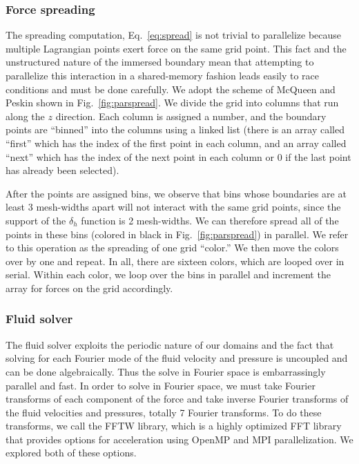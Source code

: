 \documentclass[]{article}
\begin{document}
\subsubsection{Force spreading}
The spreading computation, Eq.\ \eqref{eq:spread} is not trivial to parallelize because multiple Lagrangian points exert force on the same grid point. This fact and the unstructured nature of the immersed boundary mean that attempting to parallelize this interaction in a shared-memory fashion leads easily to race conditions and must be done carefully. We adopt the scheme of McQueen and Peskin \cite{mcqueen} shown in Fig.\ \ref{fig:parspread}. We divide the grid into columns that run along the $z$ direction. Each column is assigned a number, and the boundary points are ``binned'' into the columns using a linked list (there is an array called ``first'' which has the index of the first point in each column, and an array called ``next'' which has the index of the next point in each column or 0 if the last point has already been selected). 

After the points are assigned bins, we observe that bins whose boundaries are at least 3 mesh-widths apart will not interact with the same grid points, since the support of the $\delta_h$ function is 2 mesh-widths. We can therefore spread all of the points in these bins (colored in black in Fig.\ \ref{fig:parspread}) in parallel. We refer to this operation as the spreading of one grid ``color.'' We then move the colors over by one and repeat. In all, there are sixteen colors, which are looped over in serial. Within each color, we loop over the bins in parallel and increment the array for forces on the grid accordingly. 

\subsubsection{Fluid solver}
The fluid solver exploits the periodic nature of our domains and the fact that solving for each Fourier mode of the fluid velocity and pressure is uncoupled and can be done algebraically. Thus the solve in Fourier space is embarrassingly parallel and fast. In order to solve in Fourier space, we must take Fourier transforms of each component of the force and take inverse Fourier transforms of the fluid velocities and pressures, totally 7 Fourier transforms. To do these transforms, we call the FFTW library, which is a highly optimized FFT library that provides options for acceleration using OpenMP and MPI parallelization. We explored both of these options.
\end{document}
